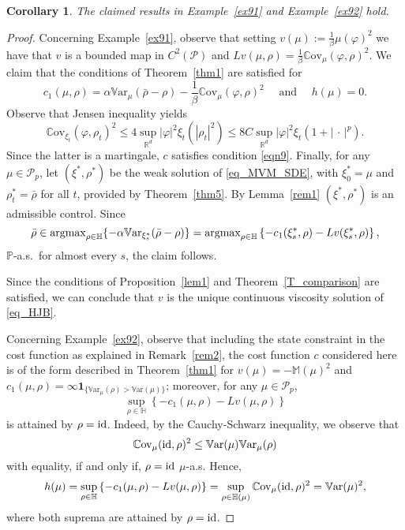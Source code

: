 \documentclass{article}
\newtheorem{corollary}[theorem]{Corollary}
\theoremstyle{definition}
\numberwithin{equation}{section}
\numberwithin{theorem}{section}
\renewcommand{\P}{\mathbb{P}}
\newcommand{\R}{\mathbb{R}}
\newcommand{\Hb}{\mathbb{H}}
\newcommand{\Mb}{\mathbb{M}}
\newcommand{\Pc}{\mathcal{P}}
\newcommand{\Cov}{\mathbb{C}\mathrm{ov}}
\newcommand{\Var}{\mathbb{V}\mathrm{ar}}
\renewcommand{\P}{{\mathbb P}}
\newcommand{\Pcal}{{\mathcal P}}
\newcommand{\fdot}{{\,\cdot\,}}
\newcommand{\id}{{\rm id}}
\begin{document}
\begin{corollary}
The claimed results in Example~\ref{ex91} and Example~\ref{ex92} hold. 
\end{corollary}
\begin{proof}
Concerning Example~\ref{ex91},
observe that setting $v(\mu):=\frac 1 \beta \mu(\varphi )^2$ we have that 
$ v$ is a bounded map in $C^2(\Pcal)$ and $L v(\mu,\rho)=\frac 1 \beta \Cov_\mu(\varphi ,\rho)^2$.
We claim that the conditions of 
 Theorem~\ref{thm1} are satisfied for 
 $$c_1(\mu,\rho)=\alpha\Var_\mu(\bar\rho-\rho)-\frac 1 \beta \Cov_\mu(\varphi ,\rho)^2\quad \text{ and } \quad
h(\mu)=
0.$$
Observe that Jensen inequality yields
$$\Cov_{\xi_t}(\varphi ,\rho_t)^2
\leq 4\sup_{\R^d} |\varphi |^2\xi_t(|\rho_t|^2)
\leq 8C \sup_{\R^d} |\varphi |^2\xi_t(1+|\fdot|^{p}).$$
Since the latter is a martingale, $c$ satisfies condition \eqref{eqn9}. Finally, for any $\mu\in\Pc_p$, let $(\xi^*,\rho^*)$ be the weak solution of \eqref{eq_MVM_SDE}, with $\xi^*_0=\mu$ and $\rho_t^*=\bar\rho$ for all $t$, provided by Theorem~\ref{thm5}.
By Lemma~\ref{rem1} $(\xi^*,\rho^*)$ is an admissible control.
Since
$$\bar\rho\in{\textup{argmax}}_{\rho\in\Hb}\{-\alpha\Var_{\xi_s^*}(\bar\rho-\rho)\}= {\textup{argmax}}_{\rho\in\Hb} \left\{ - c_1(\xi_s^*,\rho) - Lv(\xi_s^*,\rho) \right\},$$
$\P$-a.s.~for almost every $s$, the claim follows.


Since the conditions of Proposition~\ref{lem1} and Theorem~\ref{T_comparison} are satisfied, we can conclude that $v$ is  the unique continuous viscosity solution of \eqref{eq_HJB}. 


Concerning Example~\ref{ex92},
observe that including the state constraint in the cost function as explained in Remark~\ref{rem2}, the cost function $c$ considered here is of the form described in Theorem~\ref{thm1} for
 $v(\mu)=-\Mb(\mu)^2$ and $c_1(\mu,\rho)=\infty\bm1_{\{\Var_\mu(\rho)>\Var(\mu)\}}$; moreover, for any $\mu\in\Pc_p$,
$$\sup_{\rho\in\Hb} \left\{ - c_1(\mu,\rho) - Lv(\mu,\rho) \right\}$$ is attained by $\rho=\id$.
Indeed, by the Cauchy-Schwarz inequality, we observe that
$$\Cov_{\mu}(\id,\rho)^2 \le \Var(\mu) \Var_\mu(\rho)$$ with equality, if and only if, $\rho = \id$ $\mu$-a.s. Hence, $$h(\mu)=\sup_{\rho\in\Hb} \left\{ - c_1(\mu,\rho) - Lv(\mu,\rho) \right\}=\sup_{\rho\in\Hb(\mu)}\Cov_{\mu}(\id,\rho)^2=\Var(\mu)^2,$$ where both suprema are attained by $\rho=\id$. 


\end{proof}
\end{document}
